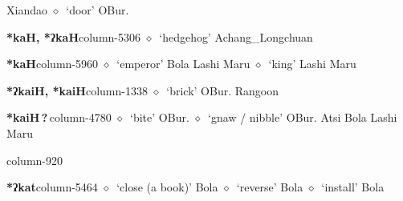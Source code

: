          Xiandao 
\hspace{1ex}
         $\diamond$~`door'
         OBur. 
  \item {\footnotesize \textbf{*kaH, *ʔkaH}}{\tiny column-5306}
         $\diamond$~`hedgehog'
         Achang\_Longchuan 
  \item {\footnotesize \textbf{*kaH}}{\tiny column-5960}
         $\diamond$~`emperor'
         Bola 
\hspace{1ex}
         Lashi 
\hspace{1ex}
         Maru 
\hspace{1ex}
         $\diamond$~`king'
         Lashi 
\hspace{1ex}
         Maru 
  \item {\footnotesize \textbf{*ʔkaiH, *kaiH}}{\tiny column-1338}
         $\diamond$~`brick'
         OBur. 
\hspace{1ex}
         Rangoon 
  \item {\footnotesize \textbf{*kaiH\,?\,}}{\tiny column-4780}
         $\diamond$~`bite'
         OBur. 
\hspace{1ex}
         $\diamond$~`gnaw / nibble'
         OBur. 
\hspace{1ex}
         Atsi 
\hspace{1ex}
         Bola 
\hspace{1ex}
         Lashi 
\hspace{1ex}
         Maru 
  \item {\footnotesize \textbf{}}{\tiny column-920}
  \item {\footnotesize \textbf{*ʔkat}}{\tiny column-5464}
         $\diamond$~`close (a book)'
         Bola 
\hspace{1ex}
         $\diamond$~`reverse'
         Bola 
\hspace{1ex}
         $\diamond$~`install'
         Bola 
